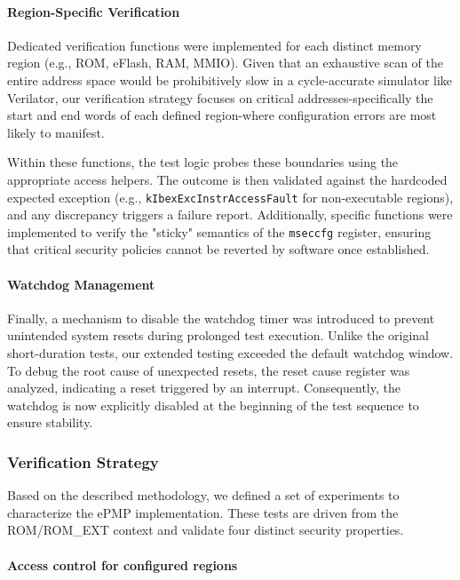 \documentclass[10pt,a4paper,twocolumn,twoside]{article}
\begin{document}
\paragraph{Region-Specific Verification}
Dedicated verification functions were implemented for each distinct memory region (e.g., ROM, eFlash, RAM, MMIO). Given that an exhaustive scan of the entire address space would be prohibitively slow in a cycle-accurate simulator like Verilator, our verification strategy focuses on critical addresses-specifically the start and end words of each defined region-where configuration errors are most likely to manifest.

Within these functions, the test logic probes these boundaries using the appropriate access helpers. The outcome is then validated against the hardcoded expected exception (e.g., \texttt{kIbexExcInstrAccessFault} for non-executable regions), and any discrepancy triggers a failure report. Additionally, specific functions were implemented to verify the "sticky" semantics of the \texttt{mseccfg} register, ensuring that critical security policies cannot be reverted by software once established.

\paragraph{Watchdog Management}
Finally, a mechanism to disable the watchdog timer was introduced to prevent unintended system resets during prolonged test execution. Unlike the original short-duration tests, our extended testing exceeded the default watchdog window. To debug the root cause of unexpected resets, the reset cause register was analyzed, indicating a reset triggered by an interrupt. Consequently, the watchdog is now explicitly disabled at the beginning of the test sequence to ensure stability.

\subsubsection{Verification Strategy}
Based on the described methodology, we defined a set of experiments to characterize the ePMP implementation. These tests are driven from the ROM/ROM\_EXT context and validate four distinct security properties.

\paragraph{Access control for configured regions}
\end{document}
